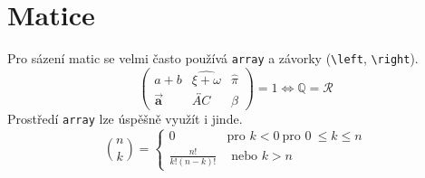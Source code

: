 \documentclass[11pt,a4paper,twocolumn]{article}
\begin{document}
  \section{Matice}
  Pro sázení matic se velmi často používá \texttt{array} a závorky (\verb|\left|, \verb|\right|).
  $$
   \left(
   \begin{array}{ccc}
    a+b & \widehat{\xi + \omega} & \hat{\pi}\\
    \overrightarrow{\textbf{a}} & \overleftrightarrow{AC} & \beta
   \end{array}
   \right) = 1 \iff \mathbb{Q} = \mathcal{R}
  $$
  Prostředí \texttt{array} lze úspěšně využít i jinde.
  $$
    \binom{n}{k} =
    \left\{
    \begin{array}{ll}
    0 & \text{pro } k < 0\ \text{pro } 0\ \leq k \leq n \\
    \frac{n!}{k! (n - k)!} &  \text{ nebo } k > n
    \end{array}
    \right.
  $$
\end{document}
